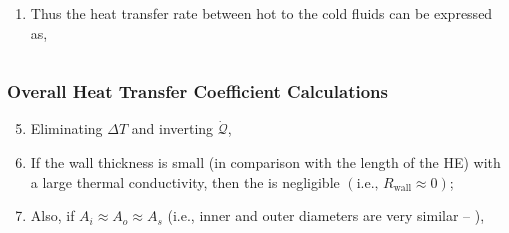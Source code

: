 \documentclass[10pt,compress,handout,ignorenonframetext,unknownkeysallowed]{beamer}
\begin{document}
\begin{frame}
\begin{columns}
\begin{column}[l]{0.5\linewidth}
\begin{enumerate}
            \item<4-> Thus the heat transfer rate between hot to the cold fluids can be expressed as,

         \end{enumerate}
       \end{column}      
    \end{columns}
\end{frame}


\begin{frame}
  \frametitle{Overall Heat Transfer Coefficient Calculations}
     \begin{enumerate}\setcounter{enumi}{4}%
        \item<1-> Eliminating $\Delta T$ and inverting $\dot{\mathcal{Q}}$,
        \item<2-> If the wall thickness is small (in comparison with the length of the HE) with a large thermal conductivity, then the  is negligible $\left(\text{i.e., }R_{\text{wall}} \approx 0\right)$;
        \item<3-> Also, if $A_{i}\approx A_{o} \approx A_{s}$ (i.e., inner and outer diameters are very similar -- ),
     \end{enumerate}

\end{frame}
\end{document}
